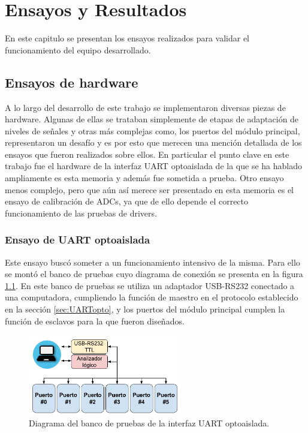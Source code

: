 
\chapter{Ensayos y Resultados} %

\label{Chapter4} %

En este capitulo se presentan los ensayos realizados para validar el funcionamiento del equipo desarrollado.

\section{Ensayos de hardware}
\label{sec:pruebasHW}

A lo largo del desarrollo de este trabajo se implementaron diversas piezas de hardware. Algunas de ellas se trataban simplemente de etapas de adaptación de niveles de señales y otras más complejas como, los puertos del módulo principal, representaron un desafío y es por esto que merecen una mención detallada de los ensayos que fueron realizados sobre ellos. En particular el punto clave en este trabajo fue el hardware de la interfaz UART optoaislada de la que se ha hablado ampliamente es esta memoria y además fue sometida a prueba. Otro ensayo menos complejo, pero que aún así merece ser presentado en esta memoria es el ensayo de calibración de ADCs, ya que de ello depende el correcto funcionamiento de las pruebas de drivers.

\subsection{Ensayo de UART optoaislada}

Este ensayo buscó someter a un funcionamiento intensivo de la misma. Para ello se montó el banco de pruebas cuyo diagrama de conexión se presenta en la figura \ref{fig:BancoPruebaUart}. En este banco de pruebas se utiliza un adaptador USB-RS232 conectado a una computadora, cumpliendo la función de maestro en el protocolo establecido en la sección \ref{sec:UARTopto}, y los puertos del módulo principal cumplen la función de esclavos para la que fueron diseñados.

\begin{figure}[H]
	\centering
	\includegraphics[width=0.6\textwidth]{./Figures/BancoPruebaUart.pdf}
	\caption{Diagrama del banco de pruebas de la interfaz UART optoaislada.}
	\label{fig:BancoPruebaUart}
\end{figure}

